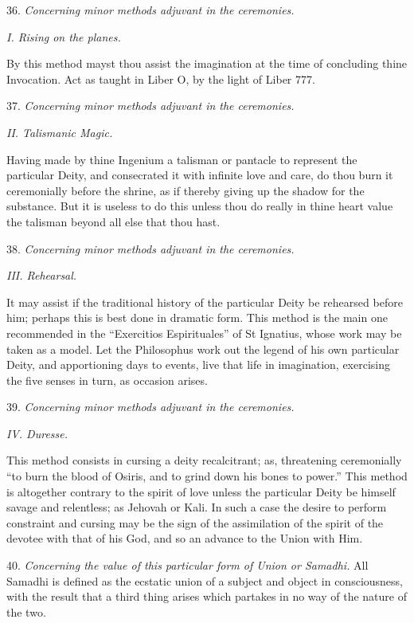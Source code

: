 36. \textit{Concerning minor methods adjuvant in the ceremonies.}

\textit{I. Rising on the planes.}


By this method mayst thou assist the imagination at the time of concluding thine Invocation. Act as taught in Liber O, by the light of Liber 777.


37. \textit{Concerning minor methods adjuvant in the ceremonies.}

\textit{II. Talismanic Magic.}


Having made by thine Ingenium a talisman or pantacle to represent the particular Deity, and consecrated it with infinite love and care, do thou burn it ceremonially before the shrine, as if thereby giving up the shadow for the substance. But it is useless to do this unless thou do really in thine heart value the talisman beyond all else that thou hast.


38. \textit{Concerning minor methods adjuvant in the ceremonies.}

\textit{III. Rehearsal.}


It may assist if the traditional history of the particular Deity be rehearsed before him; perhaps this is best done in dramatic form. This method is the main one recommended in the \enquote{Exercitios Espirituales} of St Ignatius, whose work may be taken as a model. Let the Philosophus work out the legend of his own particular Deity, and apportioning days to events, live that life in imagination, exercising the five senses in turn, as occasion arises.


39. \textit{Concerning minor methods adjuvant in the ceremonies.}

\textit{IV. Duresse.}


This method consists in cursing a deity recalcitrant; as, threatening ceremonially \enquote{to burn the blood of Osiris, and to grind down his bones to power.} This method is altogether contrary to the spirit of love unless the particular Deity be himself savage and relentless; as Jehovah or Kali. In such a case the desire to perform constraint and cursing may be the sign of the assimilation of the spirit of the devotee with that of his God, and so an advance to the Union with Him.

40. \textit{Concerning the value of this particular form of Union or Samadhi.} All Samadhi is defined as the ecstatic union of a subject and object in consciousness, with the result that a third thing arises which partakes in no way of the nature of the two.


